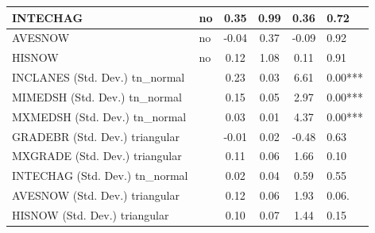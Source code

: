 \begin{table}
\begin{center}
\begin{tabular}{|l|l|c|c|c|l|}
			\hline
			INTECHAG & no & 0.35 & 0.99 & 0.36 & 0.72 \\
			\hline
			AVESNOW & no & -0.04 & 0.37 & -0.09 & 0.92 \\
			\hline
			HISNOW & no & 0.12 & 1.08 & 0.11 & 0.91 \\
			\hline
			INCLANES (Std. Dev.) tn_normal &  & 0.23 & 0.03 & 6.61 & 0.00*** \\
			\hline
			MIMEDSH (Std. Dev.) tn_normal &  & 0.15 & 0.05 & 2.97 & 0.00*** \\
			\hline
			MXMEDSH (Std. Dev.) tn_normal &  & 0.03 & 0.01 & 4.37 & 0.00*** \\
			\hline
			GRADEBR (Std. Dev.) triangular &  & -0.01 & 0.02 & -0.48 & 0.63 \\
			\hline
			MXGRADE (Std. Dev.) triangular &  & 0.11 & 0.06 & 1.66 & 0.10 \\
			\hline
			INTECHAG (Std. Dev.) tn_normal &  & 0.02 & 0.04 & 0.59 & 0.55 \\
			\hline
			AVESNOW (Std. Dev.) triangular &  & 0.12 & 0.06 & 1.93 & 0.06. \\
			\hline
			HISNOW (Std. Dev.) triangular &  & 0.10 & 0.07 & 1.44 & 0.15 \\
			\hline
		\end{tabular}
	\end{center}
\end{table}